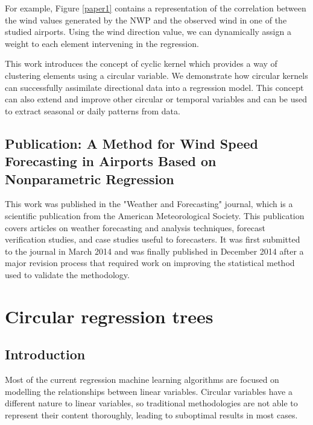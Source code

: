 For example, Figure \ref{paper1} contains a representation of the correlation between the wind values generated by the NWP and the observed wind in one of the studied airports. Using the wind direction value, we can dynamically assign a weight to each element intervening in the regression.

This work introduces the concept of cyclic kernel which provides a way of clustering elements using a circular variable. We demonstrate how circular kernels can  successfully assimilate
directional data into a regression model. This concept can also extend and improve other circular or temporal variables and can be used to extract seasonal or daily patterns from data.

\subsection{Publication: A Method for Wind Speed Forecasting in Airports Based on Nonparametric Regression}

This work was published in the "Weather and Forecasting" journal, which is a scientific publication from the American Meteorological Society. This publication covers articles on weather forecasting and analysis techniques, forecast verification studies, and case studies useful to forecasters. It was first submitted to the journal in March 2014 and was finally published in December 2014 after a major revision process that required work on improving the statistical method used to validate the methodology.



\section{Circular regression trees}

\subsection{Introduction}

Most of the current regression machine learning algorithms are focused on modelling the relationships between linear variables. Circular variables have a different nature to linear variables, so traditional methodologies are not able to represent their content thoroughly, leading to suboptimal results in most cases.

